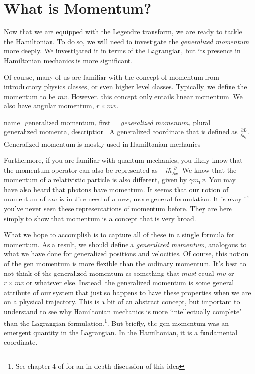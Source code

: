 \section{What is Momentum?}
Now that we are equipped with the Legendre transform, we are ready to tackle the \gls{Hamiltonian}. To do so, we will need to investigate the \textit{generalized momentum} more deeply. We investigated it in terms of the \gls{Lagrangian}, but its presence in \gls{Hamiltonian} mechanics is more significant.

Of course, many of us are familiar with the concept of momentum from introductory physics classes, or even higher level classes. Typically, we define the momentum to be $mv$. However, this concept only entails linear momentum! We also have angular momentum, $r\times mv$.

{
    name=generalized momentum,
    first = {\textit{generalized momentum}},
    plural = {generalized momenta},
    description={A generalized coordinate that is defined as $\frac{\partial L}{\partial \dot{q}_i}.$ Generalized momentum is mostly used in Hamiltonian mechanics}
}

Furthermore, if you are familiar with quantum mechanics, you likely know that the momentum operator can also be represented as $-i\hbar\frac{\partial}{\partial x}$. We know that the momentum of a relativistic particle is also different, given by $\gamma m_0v$. You may have also heard that photons have momentum. It seems that our notion of momentum of $mv$ is in dire need of a new, more general formulation. It is okay if you've never seen these representations of momentum before. They are here simply to show that momentum is a concept that is very broad.

What we hope to accomplish is to capture all of these in a single formula for momentum. As a result, we should define a \textit{generalized momentum}, analogous to what we have done for generalized positions and velocities. Of course, this notion of the \gls{gen momentum} is more flexible than the ordinary momentum. It's best to not think of the generalized momentum as something that \textit{must} equal $mv$ or $r\times mv$ or whatever else. Instead, the generalized momentum is some general attribute of our system that just so happens to have these properties when we are on a physical trajectory. This is a bit of an abstract concept, but important to understand to see why Hamiltonian mechanics is more `intellectually complete' than the \gls{Lagrangian} formulation.\footnote{See chapter 4 of \cite{carroll_biggest_2022} for an in depth discussion of this idea}. But briefly, the \gls{gen momentum} was an emergent quantity in the \gls{Lagrangian}. In the \gls{Hamiltonian}, it is a fundamental coordinate.


